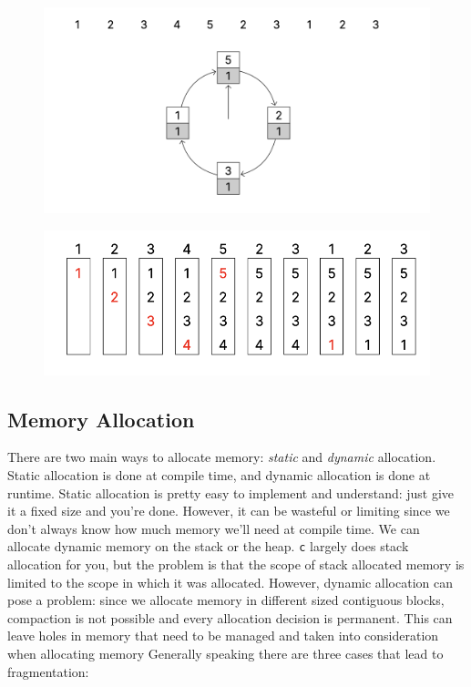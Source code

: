 \documentclass[../notes.tex]{subfiles}
\begin{document}
\begin{figure}[H]
    \centering
    \includegraphics[width=0.8\linewidth]{img/image_2023-03-29-14-00-13.png}
\end{figure}


\begin{figure}[H]
    \centering
    \includegraphics[width=0.8\linewidth]{img/image_2023-03-29-14-00-22.png}
\end{figure}

\subsection{Memory Allocation}

There are two main ways to allocate memory: \textit{static} and \textit{dynamic} allocation. Static allocation is done at compile time, and dynamic allocation is done at runtime.
Static allocation is pretty easy to implement and understand: just give it a fixed size and you're done. However, it can be wasteful or limiting since we don't always know how much memory we'll need at compile time.
We can allocate dynamic memory on the stack or the heap. \texttt{c} largely does stack allocation for you, but the problem is that the scope of stack allocated memory is limited to the scope in which it was allocated.
However, dynamic allocation can pose a problem: since we allocate memory in different sized contiguous blocks, compaction is not possible and every allocation decision is permanent. 
This can leave holes in memory that need to be managed and taken into consideration when allocating memory
Generally speaking there are three cases that lead to fragmentation:
\end{document}
